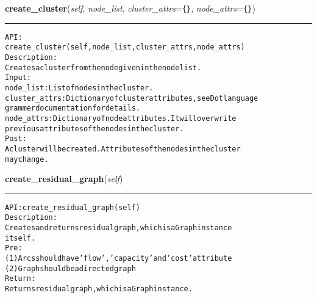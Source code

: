     \label{coinor:gimpy:graph:Graph:create_cluster}

    \vspace{0.5ex}

\hspace{.8\funcindent}\begin{boxedminipage}{\funcwidth}

    \raggedright \textbf{create\_cluster}(\textit{self}, \textit{node\_list}, \textit{cluster\_attrs}={\tt \texttt{\{}\texttt{\}}}, \textit{node\_attrs}={\tt \texttt{\{}\texttt{\}}})

    \vspace{-1.5ex}

    \rule{\textwidth}{0.5\fboxrule}
\setlength{\parskip}{2ex}
\begin{alltt}

API:
    create\_cluster(self, node\_list, cluster\_attrs, node\_attrs)
Description:
    Creates a cluster from the node given in the node list.
Input:
    node\_list: List of nodes in the cluster.
    cluster\_attrs: Dictionary of cluster attributes, see Dot language
    grammer documentation for details.
    node\_attrs: Dictionary of node attributes. It will overwrite
    previous attributes of the nodes in the cluster.
Post:
    A cluster will be created. Attributes of the nodes in the cluster
    may change.
\end{alltt}

\setlength{\parskip}{1ex}
    \end{boxedminipage}

    \label{coinor:gimpy:graph:Graph:create_residual_graph}

    \vspace{0.5ex}

\hspace{.8\funcindent}\begin{boxedminipage}{\funcwidth}

    \raggedright \textbf{create\_residual\_graph}(\textit{self})

    \vspace{-1.5ex}

    \rule{\textwidth}{0.5\fboxrule}
\setlength{\parskip}{2ex}
\begin{alltt}

API: create\_residual\_graph(self)
Description:
Creates and returns residual graph, which is a Graph instance
itself.
Pre:
    (1) Arcs should have 'flow', 'capacity' and 'cost' attribute
    (2) Graph should be a directed graph
Return:
    Returns residual graph, which is a Graph instance.
\end{alltt}

\setlength{\parskip}{1ex}
    \end{boxedminipage}


